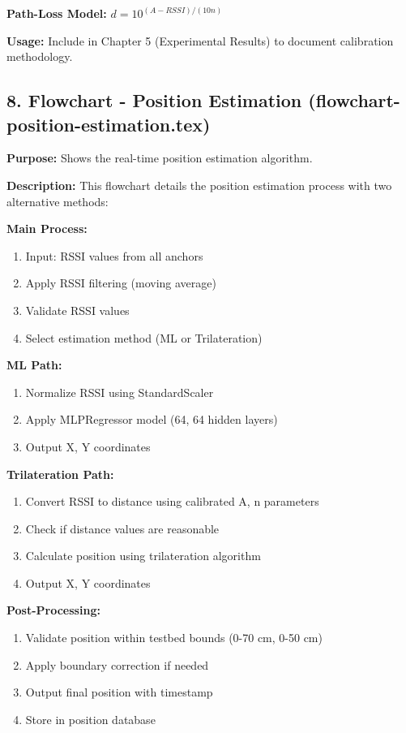\textbf{Path-Loss Model:} $d = 10^{(A - RSSI)/(10n)}$

\textbf{Usage:} Include in Chapter 5 (Experimental Results) to document calibration methodology.

\subsection*{8. Flowchart - Position Estimation (flowchart-position-estimation.tex)}
\textbf{Purpose:} Shows the real-time position estimation algorithm.

\textbf{Description:}
This flowchart details the position estimation process with two alternative methods:

\textbf{Main Process:}
\begin{enumerate}
    \item Input: RSSI values from all anchors
    \item Apply RSSI filtering (moving average)
    \item Validate RSSI values
    \item Select estimation method (ML or Trilateration)
\end{enumerate}

\textbf{ML Path:}
\begin{enumerate}
    \item Normalize RSSI using StandardScaler
    \item Apply MLPRegressor model (64, 64 hidden layers)
    \item Output X, Y coordinates
\end{enumerate}

\textbf{Trilateration Path:}
\begin{enumerate}
    \item Convert RSSI to distance using calibrated A, n parameters
    \item Check if distance values are reasonable
    \item Calculate position using trilateration algorithm
    \item Output X, Y coordinates
\end{enumerate}

\textbf{Post-Processing:}
\begin{enumerate}
    \item Validate position within testbed bounds (0-70 cm, 0-50 cm)
    \item Apply boundary correction if needed
    \item Output final position with timestamp
    \item Store in position database
\end{enumerate}

